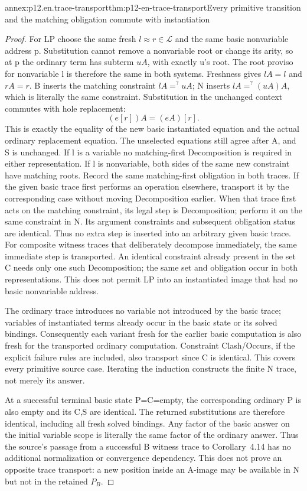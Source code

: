 \begin{annexitem}{annex:p12.en.trace-transport}{thm:p12-en-trace-transport}{Every primitive transition and the matching obligation commute with instantiation}
\begin{proof}
For LP choose the same fresh \(l\approx r\in\mathcal L\)
and the same basic nonvariable address p. Substitution cannot
remove a nonvariable root or change its arity, so at p the ordinary
term has subterm \(u A\), with exactly u's root. The root proviso
for nonvariable l is therefore the same in both systems. Freshness
gives \(l A=l\) and \(r A=r\). B inserts the matching constraint
\(l A=^{?}u A\); N inserts
\(l A=^{?}(u A)A\), which is literally the same constraint.
Substitution in the unchanged context commutes with hole replacement:
\[
                         (e[r])A=(e A)[r].
\]
This is exactly the equality of the new basic instantiated equation
and the actual ordinary replacement equation. The unselected equations
still agree after A, and S is unchanged. If l is a variable no
matching-first Decomposition is required in either representation.
If l is nonvariable, both sides of the same new constraint have
matching roots. Record the same matching-first obligation in both
traces. If the given basic trace first performs an operation elsewhere,
transport it by the corresponding case without moving Decomposition
earlier. When that trace first acts on the matching constraint, its
legal step is Decomposition; perform it on the same constraint in N.
Its argument constraints and subsequent obligation status are identical.
Thus no extra step is inserted into an arbitrary given basic trace.
For composite witness traces that deliberately decompose immediately,
the same immediate step is transported. An identical constraint already
present in the set C needs only one such Decomposition; the same
set and obligation occur in both representations. This does not
permit LP into an instantiated image that had no basic nonvariable
address.

The ordinary trace introduces no variable not introduced by the
basic trace; variables of instantiated terms already occur in the
basic state or its solved bindings. Consequently each variant fresh
for the earlier basic computation is also fresh for the transported
ordinary computation. Constraint Clash/Occurs, if the explicit
failure rules are included, also transport since C is identical.
This covers every primitive source case. Iterating the induction
constructs the finite N trace, not merely its answer.

At a successful terminal basic state P=C=empty, the corresponding
ordinary P is also empty and its C,S are identical. The returned
substitutions are therefore identical, including all fresh solved
bindings. Any factor of the basic answer on the initial variable
scope is literally the same factor of the ordinary answer. Thus the
source's passage from a successful B witness trace to Corollary~4.14
has no additional normalization or convergence dependency. This
does not prove an opposite trace transport: a new position inside
an A-image may be available in N but not in the retained \(P_B\).


\end{proof}
\end{annexitem}
